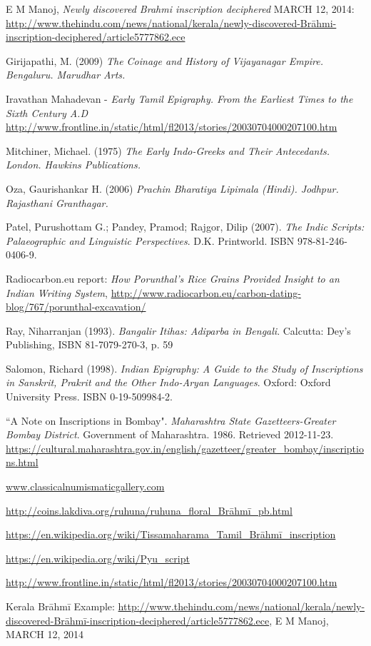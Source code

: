\begin{thebibliography}{99}
\itemsep=2pt
 E M Manoj, \textit{Newly discovered Brahmi inscription deciphered} MARCH 12, 2014: \url{http://www.thehindu.com/news/national/kerala/newly-discovered-Brāhmi-inscription-deciphered/article5777862.ece}

  Girijapathi, M. (2009) \textit{The Coinage and History of Vijayanagar Empire. Bengaluru. Marudhar Arts.}

  Iravathan Mahadevan - \textit{Early Tamil Epigraphy. From the Earliest Times to the Sixth Century A.D} \url{http://www.frontline.in/static/html/fl2013/stories/20030704000207100.htm}

  Mitchiner, Michael. (1975) \textit{The Early Indo-Greeks and Their Antecedants. London. Hawkins Publications.}

  Oza, Gaurishankar H. (2006) \textit{Prachin Bharatiya Lipimala (Hindi). Jodhpur. Rajasthani Granthagar.}

  Patel, Purushottam G.; Pandey, Pramod; Rajgor, Dilip (2007). \textit{The Indic Scripts: Palaeographic and Linguistic Perspectives}. D.K. Printworld. ISBN 978-81-246-0406-9.

  Radiocarbon.eu report: \textit{How Porunthal’s Rice Grains Provided Insight to an Indian Writing System}, \url{http://www.radiocarbon.eu/carbon-dating-blog/767/porunthal-excavation/}

  Ray, Niharranjan (1993). \textit{Bangalir Itihas: Adiparba in Bengali}. Calcutta: Dey's Publishing, ISBN 81-7079-270-3, p. 59

  Salomon, Richard (1998). \textit{Indian Epigraphy: A Guide to the Study of Inscriptions in Sanskrit, Prakrit and the Other Indo-Aryan Languages}. Oxford: Oxford University Press. ISBN 0-19-509984-2.

  “A Note on Inscriptions in Bombay". \textit{Maharashtra State Gazetteers-Greater Bombay District}. Government of Maharashtra. 1986. Retrieved 2012-11-23. \url{https://cultural.maharashtra.gov.in/english/gazetteer/greater_bombay/inscriptions.html}

  \url{www.classicalnumismaticgallery.com}

  \url{http://coins.lakdiva.org/ruhuna/ruhuna_floral_Brāhmī_pb.html}

  \url{https://en.wikipedia.org/wiki/Tissamaharama_Tamil_Brāhmī_inscription}

  \url{https://en.wikipedia.org/wiki/Pyu_script}

  \url{http://www.frontline.in/static/html/fl2013/stories/20030704000207100.htm}

  Kerala Brāhmī Example: \url{http://www.thehindu.com/news/national/kerala/newly-discovered-Brāhmī-inscription-deciphered/article5777862.ece}, E M Manoj, MARCH 12, 2014
 
 \end{thebibliography}

